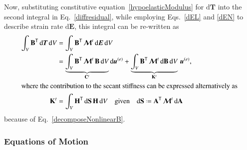 Now, substituting constitutive equation~\ref{hypoelasticModulus} for $\mathrm{d} \boldsymbol{T}$ into the second integral in Eq.~\ref{diffresidual}, while employing Eqs.~\ref{dEL} and \ref{dEN} to describe strain rate $\mathrm{d}\boldsymbol{E}$, this integral can be re-written as 
\begin{subequations}
    \label{tangentStiffness}
    \begin{align}
    \int_V \mathbf{B}^{\mathsf{T}} \, \mathrm{d} \boldsymbol{T} \, \mathrm{d}V & = 
    \int_V \mathbf{B}^{\mathsf{T}} \, \boldsymbol{\mathcal{M}}^t \, \mathrm{d} \boldsymbol{E} \, \mathrm{d}V \\ 
    \mbox{} & = \underbrace{\int_V \mathbf{B}^{\mathsf{T}} \, \boldsymbol{\mathcal{M}}^t \, 
    \mathbf{B} \, \mathrm{d}V}_{\mathbf{C}^t} \mathrm{d}\boldsymbol{u}^{(e)} + 
    \underbrace{\int_V \mathbf{B}^{\mathsf{T}} \, \boldsymbol{\mathcal{M}}^t \, \mathrm{d}
    \mathbf{B} \, \mathrm{d} V}_{\mathbf{K}^t} \, \boldsymbol{u}^{(e)} , \\
    \intertext{where the contribution to the secant stiffness can be expressed alternatively as}
    \mathbf{K}^t & = \int_V \mathbf{H}^{\mathsf{T}} \, \mathrm{d} \mathbf{S} \, 
    \mathbf{H} \, \mathrm{d} V 
    \quad \text{given} \quad
    \mathrm{d} \mathbf{S} \defeq \mathbf{A}^{\mathsf{T}} \, 
    \boldsymbol{\mathcal{M}}^t \, \mathrm{d} \mathbf{A}
    \end{align}
\end{subequations}
because of Eq.~\ref{decomposeNonlinearB}.


\subsubsection{Equations of Motion}

